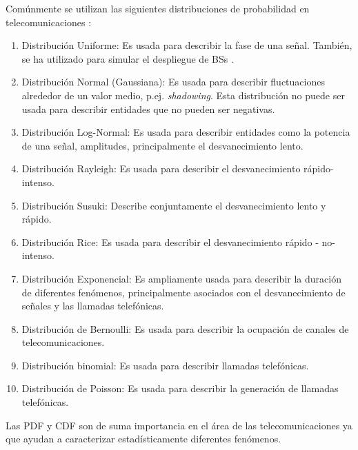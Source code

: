 Comúnmente se utilizan las siguientes distribuciones de probabilidad en telecomunicaciones \parencite{Correia2018}:

\begin{enumerate}
    \item Distribución Uniforme: Es usada para describir la fase de una señal. También, se ha utilizado para simular el despliegue de BSs \parencite{TurjmanSmallCells}.
    \item Distribución Normal (Gaussiana): Es usada para describir fluctuaciones alrededor de un valor medio, p.ej. \textit{shadowing}. Esta distribución no puede ser usada para describir entidades que no pueden ser negativas.
    \item Distribución Log-Normal: Es usada para describir entidades como la potencia de una señal, amplitudes, principalmente el desvanecimiento lento.
    \item Distribución Rayleigh: Es usada para describir el desvanecimiento rápido-intenso.
    \item Distribución Susuki: Describe conjuntamente el desvanecimiento lento y rápido.
    \item Distribución Rice: Es usada para describir el desvanecimiento rápido - no-intenso.
    \item Distribución Exponencial: Es ampliamente usada para describir la duración de diferentes fenómenos, principalmente asociados con el desvanecimiento de señales y las llamadas telefónicas.
    \item Distribución de Bernoulli: Es usada para describir la ocupación de canales de telecomunicaciones.
    \item Distribución binomial: Es usada para describir llamadas telefónicas.
    \item Distribución de Poisson: Es usada para describir la generación de llamadas telefónicas.
\end{enumerate}

Las PDF y CDF son de suma importancia en el área de las telecomunicaciones ya que ayudan a caracterizar estadísticamente diferentes fenómenos.\newline



